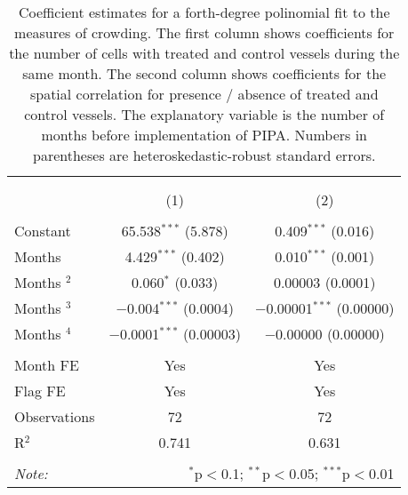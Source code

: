 
\begin{table}[!htbp] \centering 
  \caption{\label{tab:sp_corr}Coefficient estimates for a forth-degree polinomial fit to the measures of crowding. The first column shows coefficients for the number of cells with treated and control vessels during the same month. The second column shows coefficients for the spatial correlation for presence / absence of treated and control vessels. The explanatory variable is the number of months before implementation of PIPA. Numbers in parentheses are heteroskedastic-robust standard errors.} 
  \label{} 
\footnotesize 
\begin{tabular}{@{\extracolsep{1pt}}lcc} 
\\[-1.8ex]\hline 
\hline \\[-1.8ex] 
\\[-1.8ex] & (1) & (2)\\ 
\hline \\[-1.8ex] 
 Constant & 65.538$^{***}$ (5.878) & 0.409$^{***}$ (0.016) \\ 
  Months & 4.429$^{***}$ (0.402) & 0.010$^{***}$ (0.001) \\ 
  Months $^2$ & 0.060$^{*}$ (0.033) & 0.00003 (0.0001) \\ 
  Months $^3$ & $-$0.004$^{***}$ (0.0004) & $-$0.00001$^{***}$ (0.00000) \\ 
  Months $^4$ & $-$0.0001$^{***}$ (0.00003) & $-$0.00000 (0.00000) \\ 
 \hline \\[-1.8ex] 
Month FE & Yes & Yes \\ 
Flag FE & Yes & Yes \\ 
Observations & 72 & 72 \\ 
R$^{2}$ & 0.741 & 0.631 \\ 
\hline 
\hline \\[-1.8ex] 
\textit{Note:}  & \multicolumn{2}{r}{$^{*}$p$<$0.1; $^{**}$p$<$0.05; $^{***}$p$<$0.01} \\ 
\end{tabular} 
\end{table} 
